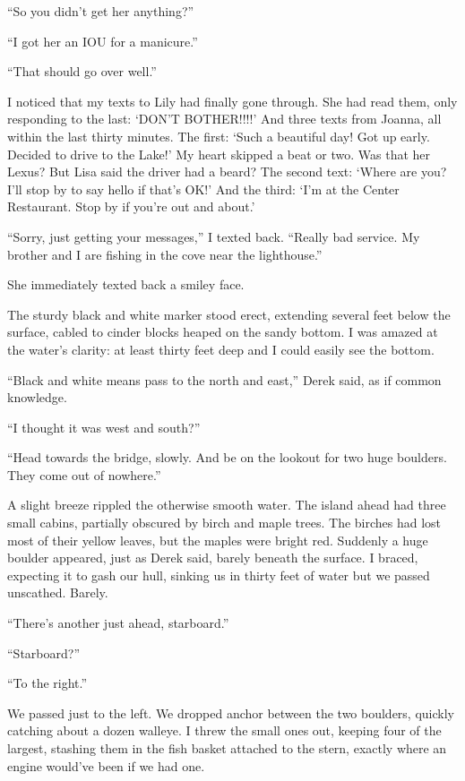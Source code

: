 ``So you didn't get her anything?''

``I got her an IOU for a manicure.''

``That should go over well.''

I noticed that my texts to Lily had finally gone through. She had read
them, only responding to the last: `DON'T BOTHER!!!!' And three texts
from Joanna, all within the last thirty minutes. The first: `Such a
beautiful day! Got up early. Decided to drive to the Lake!' My heart
skipped a beat or two. Was that her Lexus? But Lisa said the driver had
a beard? The second text: `Where are you? I'll stop by to say hello if
that's OK!' And the third: `I'm at the Center Restaurant. Stop by if
you're out and about.'

``Sorry, just getting your messages,'' I texted back. ``Really bad
service. My brother and I are fishing in the cove near the lighthouse.''

She immediately texted back a smiley face.

The sturdy black and white marker stood erect, extending several feet
below the surface, cabled to cinder blocks heaped on the sandy bottom. I
was amazed at the water's clarity: at least thirty feet deep and I could
easily see the bottom.

``Black and white means pass to the north and east,'' Derek said, as if
common knowledge.

``I thought it was west and south?''

``Head towards the bridge, slowly. And be on the lookout for two huge
boulders. They come out of nowhere.''

A slight breeze rippled the otherwise smooth water. The island ahead had
three small cabins, partially obscured by birch and maple trees. The
birches had lost most of their yellow leaves, but the maples were bright
red. Suddenly a huge boulder appeared, just as Derek said, barely
beneath the surface. I braced, expecting it to gash our hull, sinking us
in thirty feet of water but we passed unscathed. Barely.

``There's another just ahead, starboard.''

``Starboard?''

``To the right.''

We passed just to the left. We dropped anchor between the two boulders,
quickly catching about a dozen walleye. I threw the small ones out,
keeping four of the largest, stashing them in the fish basket attached
to the stern, exactly where an engine would've been if we had one.


